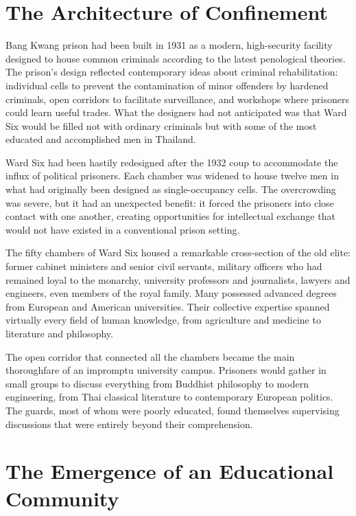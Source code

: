 \documentclass[
  Letterpaper,
]{scrbook}
\begin{document}
\section{The Architecture of
Confinement}\label{the-architecture-of-confinement}

Bang Kwang prison had been built in 1931 as a modern, high-security
facility designed to house common criminals according to the latest
penological theories. The prison's design reflected contemporary ideas
about criminal rehabilitation: individual cells to prevent the
contamination of minor offenders by hardened criminals, open corridors
to facilitate surveillance, and workshops where prisoners could learn
useful trades. What the designers had not anticipated was that Ward Six
would be filled not with ordinary criminals but with some of the most
educated and accomplished men in Thailand.

Ward Six had been hastily redesigned after the 1932 coup to accommodate
the influx of political prisoners. Each chamber was widened to house
twelve men in what had originally been designed as single-occupancy
cells. The overcrowding was severe, but it had an unexpected benefit: it
forced the prisoners into close contact with one another, creating
opportunities for intellectual exchange that would not have existed in a
conventional prison setting.

The fifty chambers of Ward Six housed a remarkable cross-section of the
old elite: former cabinet ministers and senior civil servants, military
officers who had remained loyal to the monarchy, university professors
and journalists, lawyers and engineers, even members of the royal
family. Many possessed advanced degrees from European and American
universities. Their collective expertise spanned virtually every field
of human knowledge, from agriculture and medicine to literature and
philosophy.

The open corridor that connected all the chambers became the main
thoroughfare of an impromptu university campus. Prisoners would gather
in small groups to discuss everything from Buddhist philosophy to modern
engineering, from Thai classical literature to contemporary European
politics. The guards, most of whom were poorly educated, found
themselves supervising discussions that were entirely beyond their
comprehension.

\section{The Emergence of an Educational
Community}\label{the-emergence-of-an-educational-community}
\end{document}
